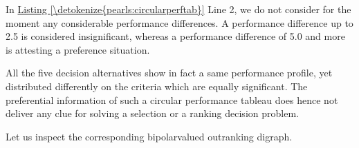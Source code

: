 \documentclass[a4paper,12pt,english]{sphinxhowto}
\begin{document}
\sphinxAtStartPar
In \hyperref[\detokenize{pearls:circularperftab}]{Listing \ref{\detokenize{pearls:circularperftab}}} Line 2, we do not consider for the moment any considerable performance differences. A performance difference up to 2.5 is considered insignificant, whereas a performance difference of 5.0 and more is attesting a preference situation.

%
\begin{sphinxVerbatim}[commandchars=\\\{\},numbers=left,firstnumber=1,stepnumber=1]
\end{sphinxVerbatim}
\sphinxresetverbatimhllines

\sphinxAtStartPar
All the five decision alternatives show in fact a same performance profile, yet distributed differently on the criteria which are equally significant. The preferential information of such a circular performance tableau does hence not deliver any clue for solving a selection or a ranking decision problem.

\sphinxAtStartPar
Let us inspect the corresponding bipolar\sphinxhyphen{}valued outranking digraph.

\begin{sphinxVerbatim}[commandchars=\\\{\},numbers=left,firstnumber=1,stepnumber=1]
 
  
\end{sphinxVerbatim}
\end{document}
